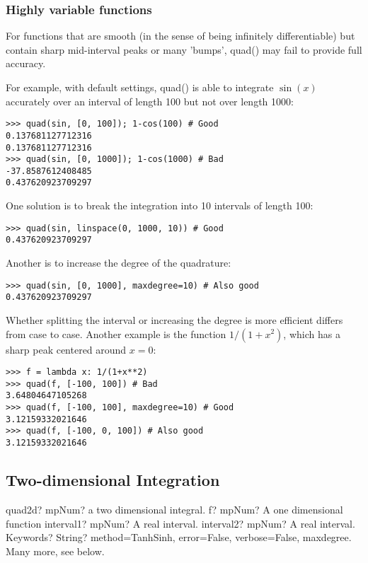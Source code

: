 \subsubsection{Highly variable functions}

For functions that are smooth (in the sense of being infinitely differentiable) but contain sharp mid-interval peaks or many 'bumps', quad() may fail to provide full accuracy.

For example, with default settings, quad() is able to integrate $\sin(x)$ accurately over an interval of length 100 but not over length 1000:

\begin{lstlisting}
>>> quad(sin, [0, 100]); 1-cos(100) # Good
0.137681127712316
0.137681127712316
>>> quad(sin, [0, 1000]); 1-cos(1000) # Bad
-37.8587612408485
0.437620923709297
\end{lstlisting}

One solution is to break the integration into 10 intervals of length 100:

\begin{lstlisting}
>>> quad(sin, linspace(0, 1000, 10)) # Good
0.437620923709297
\end{lstlisting}

Another is to increase the degree of the quadrature:

\begin{lstlisting}
>>> quad(sin, [0, 1000], maxdegree=10) # Also good
0.437620923709297
\end{lstlisting}

Whether splitting the interval or increasing the degree is more efficient differs from case to case. Another example is the function $1/(1+x^2)$, which has a sharp peak centered around $x=0$:

\begin{lstlisting}
>>> f = lambda x: 1/(1+x**2)
>>> quad(f, [-100, 100]) # Bad
3.64804647105268
>>> quad(f, [-100, 100], maxdegree=10) # Good
3.12159332021646
>>> quad(f, [-100, 0, 100]) # Also good
3.12159332021646
\end{lstlisting}



\subsection{Two-dimensional Integration}

\begin{mpFunctionsExtract}
	\mpFunctionFour
	{quad2d? mpNum? a two dimensional integral.}
	{f? mpNum? A one dimensional function}
	{interval1? mpNum? A real interval.}	
	{interval2? mpNum? A real interval.}		
	{Keywords? String? method=TanhSinh, error=False, verbose=False, maxdegree. Many more, see below.}	
\end{mpFunctionsExtract}

